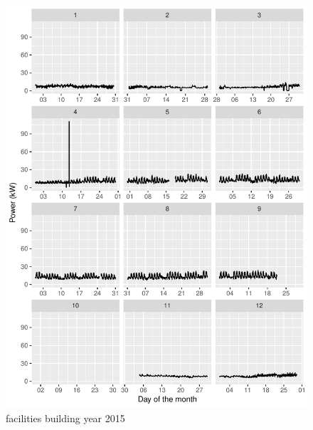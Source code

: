 \documentclass[11pt, oneside]{article}   	%
\begin{document}
\begin{figure}
\includegraphics[keepaspectratio]{facilities_build_Y2015.pdf}
\caption{facilities building year 2015 }
\end{figure}
\end{document}
